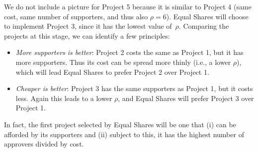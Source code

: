 \documentclass[10pt]{scrartcl}
\theoremstyle{definition}
\theoremstyle{plain}
\begin{document}
We do not include a picture for Project 5 because it is similar to Project 4 (same cost, same number of supporters, and thus also $\rho = 6$). Equal Shares will choose to implement Project 3, since it has the lowest value of~$\rho$. Comparing the projects at this stage, we can identify a few principles:
\begin{itemize}
	\item \emph{More supporters is better}: Project 2 costs the same as Project 1, but it has more supporters. Thus its cost can be spread more thinly (i.e., a lower $\rho$), which will lead Equal Shares to prefer Project 2 over Project 1.
	\item \emph{Cheaper is better}: Project 3 has the same supporters as Project 1, but it costs less. Again this leads to a lower $\rho$, and Equal Shares will prefer Project 3 over Project 1.
\end{itemize}
In fact, the first project selected by Equal Shares will be one that (i) can be afforded by its supporters and (ii) subject to this, it has the highest number of approvers divided by cost.
\end{document}
